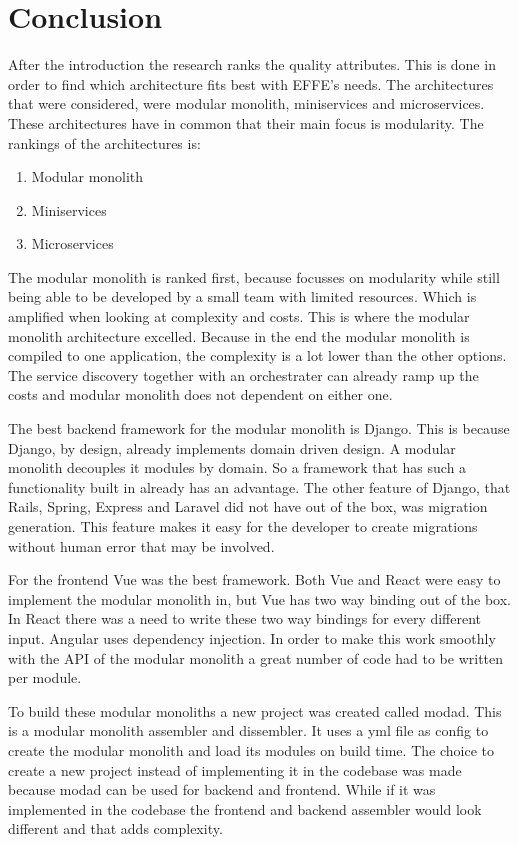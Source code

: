 \chapter{Conclusion}

After the introduction the research ranks the quality attributes. This is done in order to find which architecture fits best with EFFE's needs. The architectures that were considered, were modular monolith, miniservices and microservices. These architectures have in common that their main focus is modularity. The rankings of the architectures is:
\begin{enumerate}
  \item Modular monolith
  \item Miniservices
  \item Microservices
\end{enumerate}

The modular monolith is ranked first, because focusses on modularity while still being able to be developed by a small team with limited resources. Which is amplified when looking at complexity and costs. This is where the modular monolith architecture excelled. Because in the end the modular monolith is compiled to one application, the complexity is a lot lower than the other options. The service discovery together with an orchestrater can already ramp up the costs and modular monolith does not dependent on either one.

The best backend framework for the modular monolith is Django. This is because Django, by design, already implements domain driven design. A modular monolith decouples it modules by domain. So a framework that has such a functionality built in already has an advantage. The other feature of Django, that Rails, Spring, Express and Laravel did not have out of the box, was migration generation. This feature makes it easy for the developer to create migrations without human error that may be involved.

For the frontend Vue was the best framework. Both Vue and React were easy to implement the modular monolith in, but Vue has two way binding out of the box. In React there was a need to write these two way bindings for every different input. Angular uses dependency injection. In order to make this work smoothly with the API of the modular monolith a great number of code had to be written per module.

To build these modular monoliths a new project was created called modad. This is a modular monolith assembler and dissembler. It uses a yml file as config to create the modular monolith and load its modules on build time. The choice to create a new project instead of implementing it in the codebase was made because modad can be used for backend and frontend. While if it was implemented in the codebase the frontend and backend assembler would look different and that adds complexity.

